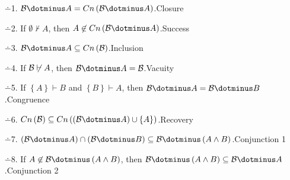 \begin{enumerate}
\item[$\dotminus$1.] $\begin{cal}B\end{cal}\dotminus A=Cn\left(\begin{cal}B\end{cal}\dotminus A\right)$.\hfill Closure
\item[$\dotminus$2.] If $\emptyset\not\vdash A$, then $A\not\in Cn\left(\begin{cal}B\end{cal}\dotminus A\right)$.\hfill Success
\item[$\dotminus$3.] $\begin{cal}B\end{cal}\dotminus A\subseteq Cn\left(\cal B\right)$.\hfill Inclusion
\item[$\dotminus$4.] If $\begin{cal}B\end{cal}\not\vdash A$, then $\begin{cal}B\end{cal}\dotminus A=\cal B$.\hfill Vacuity
\item[$\dotminus$5.] If $\left\{A\right\}\vdash B$ and $\left\{B\right\}\vdash A$, then $\begin{cal}B\end{cal}\dotminus A=\begin{cal}B\end{cal}\dotminus B$.\hfill Congruence
\item[$\dotminus$6.] $Cn\left(\begin{cal}B\end{cal}\right)\subseteq Cn\left(\left(\begin{cal}B\end{cal}\dotminus A\right)\cup\left\{A\right\}\right)$.\hfill Recovery
\item[$\dotminus$7.] $\left(\begin{cal}B\end{cal}\dotminus A\right)\cap\left(\begin{cal}B\end{cal}\dotminus B\right)\subseteq\begin{cal}B\end{cal}\dotminus \left(A\wedge B\right)$.\hfill Conjunction 1
\item[$\dotminus$8.] If $A\not\in\begin{cal}B\end{cal}\dotminus \left(A\wedge B\right)$, then $\begin{cal}B\end{cal}\dotminus \left(A\wedge B\right)\subseteq\begin{cal}B\end{cal}\dotminus A$.\hfill Conjunction 2
\end{enumerate}
